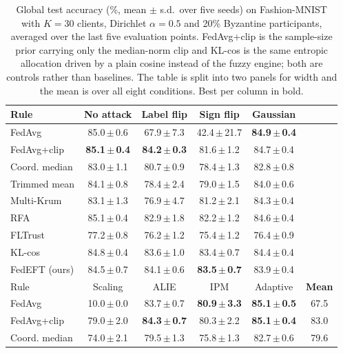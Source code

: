\begin{table}[t]
\centering
\caption{Global test accuracy (\%, mean $\pm$ s.d.\ over five seeds) on Fashion-MNIST with $K=30$ clients, Dirichlet $\alpha=0.5$ and 20\% Byzantine participants, averaged over the last five evaluation points. FedAvg+clip is the sample-size prior carrying only the median-norm clip and KL-cos is the same entropic allocation driven by a plain cosine instead of the fuzzy engine; both are controls rather than baselines. The table is split into two panels for width and the mean is over all eight conditions. Best per column in bold.}
\label{tab:main_fmnist}
\setlength{\tabcolsep}{4.0pt}
\footnotesize
\begin{tabular}{@{}lccccc@{}}
\toprule
Rule & No attack & Label flip & Sign flip & Gaussian & \\
\midrule
FedAvg & 85.0\,$\pm$\,0.6 & 67.9\,$\pm$\,7.3 & 42.4\,$\pm$\,21.7 & \textbf{84.9\,$\pm$\,0.4} & \\
FedAvg+clip & \textbf{85.1\,$\pm$\,0.4} & \textbf{84.2\,$\pm$\,0.3} & 81.6\,$\pm$\,1.2 & 84.7\,$\pm$\,0.4 & \\
Coord. median & 83.0\,$\pm$\,1.1 & 80.7\,$\pm$\,0.9 & 78.4\,$\pm$\,1.3 & 82.8\,$\pm$\,0.8 & \\
Trimmed mean & 84.1\,$\pm$\,0.8 & 78.4\,$\pm$\,2.4 & 79.0\,$\pm$\,1.5 & 84.0\,$\pm$\,0.6 & \\
Multi-Krum & 83.1\,$\pm$\,1.3 & 76.9\,$\pm$\,4.7 & 81.2\,$\pm$\,2.1 & 84.3\,$\pm$\,0.4 & \\
RFA & 85.1\,$\pm$\,0.4 & 82.9\,$\pm$\,1.8 & 82.2\,$\pm$\,1.2 & 84.6\,$\pm$\,0.4 & \\
FLTrust & 77.2\,$\pm$\,0.8 & 76.2\,$\pm$\,1.2 & 75.4\,$\pm$\,1.2 & 76.4\,$\pm$\,0.9 & \\
KL-cos & 84.8\,$\pm$\,0.4 & 83.6\,$\pm$\,1.0 & 83.4\,$\pm$\,0.7 & 84.4\,$\pm$\,0.4 & \\
\midrule
FedEFT (ours) & 84.5\,$\pm$\,0.7 & 84.1\,$\pm$\,0.6 & \textbf{83.5\,$\pm$\,0.7} & 83.9\,$\pm$\,0.4 & \\
\midrule
\midrule
Rule & Scaling & ALIE & IPM & Adaptive & \textbf{Mean}\\
\midrule
FedAvg & 10.0\,$\pm$\,0.0 & 83.7\,$\pm$\,0.7 & \textbf{80.9\,$\pm$\,3.3} & \textbf{85.1\,$\pm$\,0.5} & 67.5\\
FedAvg+clip & 79.0\,$\pm$\,2.0 & \textbf{84.3\,$\pm$\,0.7} & 80.3\,$\pm$\,2.2 & \textbf{85.1\,$\pm$\,0.4} & 83.0\\
Coord. median & 74.0\,$\pm$\,2.1 & 79.5\,$\pm$\,1.3 & 75.8\,$\pm$\,1.3 & 82.7\,$\pm$\,0.6 & 79.6\\

\end{tabular}
\end{table}
